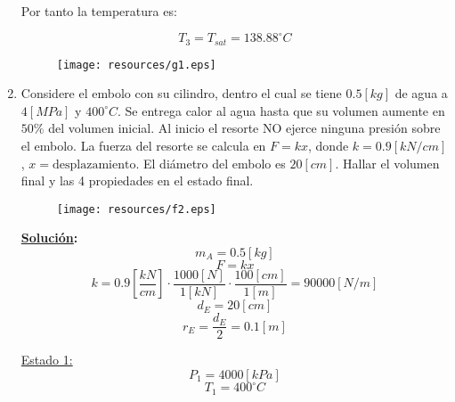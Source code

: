 \documentclass[letter,11pt]{article}
\begin{document}
\begin{enumerate}
Por tanto la temperatura es:

\begin{equation*}
    T_3=T_{sat}=138.88^\circ C
\end{equation*}

\begin{figure}[!h]
\centering
\texttt{[image: resources/g1.eps]}
\end{figure}
\vspace{1.0cm}

\newpage

\item Considere el embolo con su cilindro, dentro el cual se tiene $0.5[kg]$ de
agua a $4[MPa]$ y $400^\circ C$. Se entrega calor al agua hasta que su volumen
aumente en $50\%$ del volumen inicial. Al inicio el resorte NO ejerce ninguna
presión sobre el embolo. La fuerza del resorte se calcula en $F = kx$, donde
$k = 0.9 [kN/cm]$, $x = \text{desplazamiento}$. El diámetro del embolo es
$20 [cm]$. Hallar el volumen final y las 4 propiedades en el estado final.

\vspace{0.75cm}
\begin{figure}[!h]
\centering
\texttt{[image: resources/f2.eps]}
\end{figure}
\vspace{0.75cm}

\textbf{\underline{Solución}:} \\

\begin{equation*}
    m_A=0.5[kg]
\end{equation*}
\begin{equation*}
    F=kx
\end{equation*}
\begin{equation*}
    k=0.9[\frac{kN}{cm}]\cdot\frac{1000[N]}{1[kN]}\cdot\frac{100[cm]}{1[m]}=90000[N/m]
\end{equation*}
\begin{equation*}
    d_E=20[cm]
\end{equation*}
\begin{equation*}
    r_E=\frac{d_E}{2}=0.1[m]
\end{equation*}

\underline{Estado 1:} \\

\begin{equation*}
    P_1=4000[kPa]
\end{equation*}
\begin{equation*}
    T_1=400^\circ C
\end{equation*}


\end{enumerate}
\end{document}
